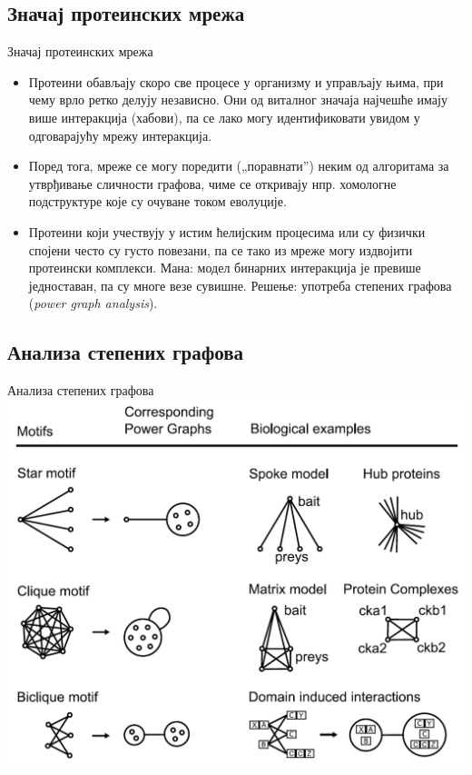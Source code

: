 \documentclass[hyperref={bookmarks=false}]{beamer}
\begin{document}
\subsection{Значај протеинских мрежа}
\begin{frame}{Значај протеинских мрежа}
\begin{itemize}
	\item Протеини обављају скоро све процесе у организму и управљају њима, при чему врло ретко делују независно. Они од виталног значаја најчешће имају више интеракција (хабови), па се лако могу идентификовати увидом у одговарајућу мрежу интеракција.

	\item Поред тога, мреже се могу поредити („поравнати”) неким од алгоритама за утврђивање сличности графова, чиме се откривају нпр. хомологне подструктуре које су очуване током еволуције.

	\item Протеини који учествују у истим ћелијским процесима или су физички спојени често су густо повезани, па се тако из мреже могу издвојити протеински комплекси. Мана: модел бинарних интеракција је превише једноставан, па су многе везе сувишне. Решење: употреба степених графова (\textit{power graph analysis}).
\end{itemize}
\end{frame}

\subsection{Анализа степених графова}
\begin{frame}{Анализа степених графова}
\centering\includegraphics[width=.75\textwidth]{power_graph.png}
\end{frame}
\end{document}
